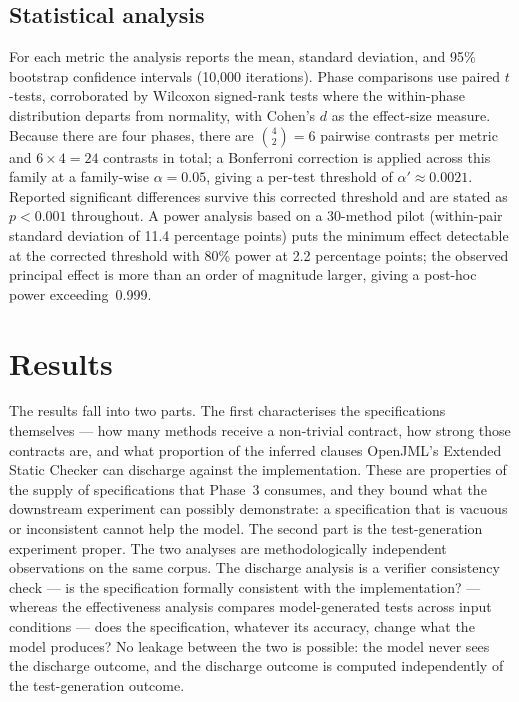 \subsection{Statistical analysis}
\label{sec:art1:stats}

For each metric the analysis reports the mean, standard deviation, and 95\%
bootstrap confidence intervals (10{,}000 iterations). Phase comparisons use paired
$t$-tests, corroborated by Wilcoxon signed-rank tests where the within-phase
distribution departs from normality, with Cohen's $d$ as the effect-size measure.
Because there are four phases, there are $\binom{4}{2} = 6$ pairwise contrasts per
metric and $6 \times 4 = 24$ contrasts in total; a Bonferroni correction is
applied across this family at a family-wise $\alpha = 0.05$, giving a per-test
threshold of $\alpha' \approx 0.0021$. Reported significant differences survive
this corrected threshold and are stated as $p < 0.001$ throughout. A power
analysis based on a 30-method pilot (within-pair standard deviation of 11.4
percentage points) puts the minimum effect detectable at the corrected threshold
with 80\% power at 2.2 percentage points; the observed principal effect is more
than an order of magnitude larger, giving a post-hoc power exceeding~0.999.

\section{Results}
\label{sec:art1:results}

The results fall into two parts. The first characterises the specifications
themselves --- how many methods receive a non-trivial contract, how strong those
contracts are, and what proportion of the inferred clauses OpenJML's Extended
Static Checker can discharge against the implementation. These are properties of
the supply of specifications that Phase~3 consumes, and they bound what the
downstream experiment can possibly demonstrate: a specification that is vacuous or
inconsistent cannot help the model. The second part is the test-generation
experiment proper. The two analyses are methodologically independent observations
on the same corpus. The discharge analysis is a verifier consistency check ---
is the specification formally consistent with the implementation? --- whereas the
effectiveness analysis compares model-generated tests across input conditions ---
does the specification, whatever its accuracy, change what the model produces? No
leakage between the two is possible: the model never sees the discharge outcome,
and the discharge outcome is computed independently of the test-generation
outcome.

